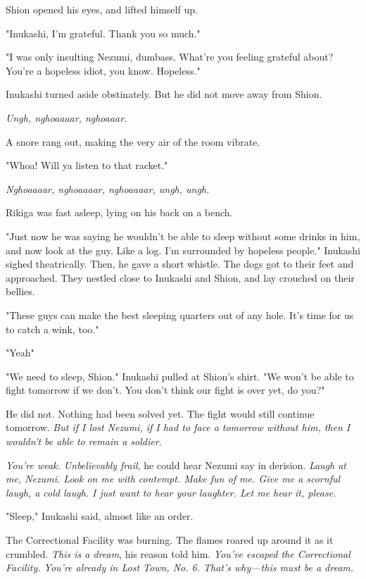 Shion opened his eyes, and lifted himself up.

"Inukashi, I'm grateful. Thank you so much."

"I was only insulting Nezumi, dumbass. What're you feeling grateful
about? You're a hopeless idiot, you know. Hopeless."

Inukashi turned aside obstinately. But he did not move away from Shion.

\emph{Ungh, nghoaaaar, nghoaaar.}

A snore rang out, making the very air of the room vibrate.

"Whoa! Will ya listen to that racket."

\emph{Nghoaaaar, nghoaaaar, nghoaaaar, ungh, ungh.}

Rikiga was fast asleep, lying on his back on a bench.

"Just now he was saying he wouldn't be able to sleep without some drinks
in him, and now look at the guy. Like a log. I'm surrounded by hopeless
people." Inukashi sighed theatrically. Then, he gave a short whistle.
The dogs got to their feet and approached. They nestled close to
Inukashi and Shion, and lay crouched on their bellies.

"These guys can make the best sleeping quarters out of any hole. It's
time for us to catch a wink, too."

"Yeah\el "

"We need to sleep, Shion." Inukashi pulled at Shion's shirt. "We won't
be able to fight tomorrow if we don't. You don't think our fight is over
yet, do you?"

He did not. Nothing had been solved yet. The fight would still continue
tomorrow. \emph{But if I lost Nezumi, if I had to face a tomorrow without him,
then I wouldn't be able to remain a soldier.}

\emph{You're weak. Unbelievably frail}, he could hear Nezumi say in derision.
\emph{Laugh at me, Nezumi. Look on me with contempt. Make fun of me. Give me a
scornful laugh, a cold laugh. I just want to hear your laughter. Let me
hear it, please.}

"Sleep," Inukashi said, almost like an order.

\mybreak

The Correctional Facility was burning. The flames roared up around it as
it crumbled. \emph{This is a dream}, his reason told him. \emph{You've escaped the
Correctional Facility. You're already in Lost Town, No. 6. That's
why---this must be a dream.}

